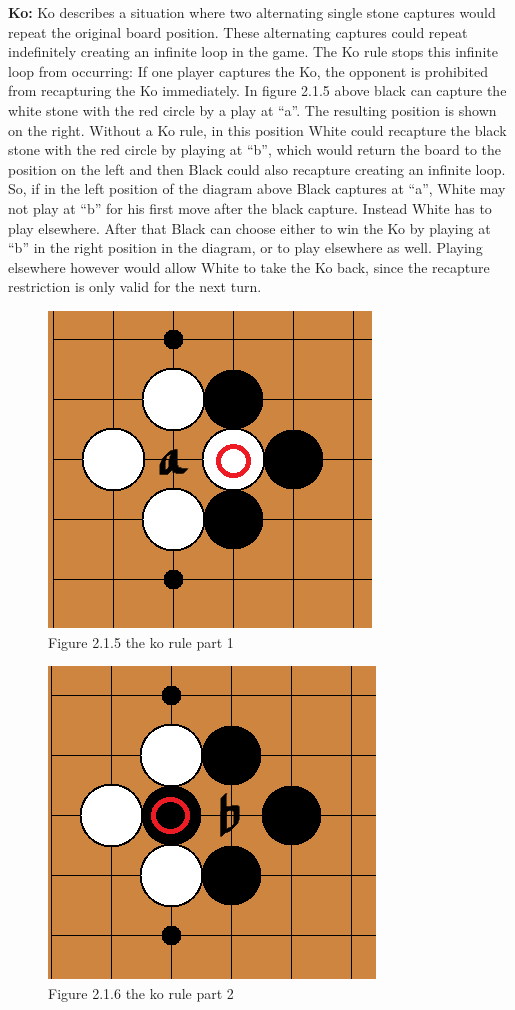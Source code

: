 \documentclass{l3proj}
\begin{document}
\textbf{Ko:} Ko describes a situation where two alternating single stone captures would repeat the original board position. These alternating captures could repeat indefinitely creating an infinite loop in the game. The Ko rule stops this infinite loop from occurring: If one player captures the Ko, the opponent is prohibited from recapturing the Ko immediately. In figure 2.1.5 above black can capture the white stone with the red circle by a play at “a”. The resulting position is shown on the right. Without a Ko rule, in this position White could recapture the black stone with the red circle by playing at “b”, which would return the board to the position on the left and then Black could also recapture creating an infinite loop. So, if in the left position of the diagram above Black captures at “a”, White may not play at “b” for his first move after the black capture. Instead White has to play elsewhere. After that Black can choose either to win the Ko by playing at “b” in the right position in the diagram, or to play elsewhere as well. Playing elsewhere however would allow White to take the Ko back, since the recapture restriction is only valid for the next turn.

\begin{figure}[H]
\centering
\includegraphics[scale=0.5]{Images/korule2.png}
\caption{Figure 2.1.5 the ko rule part 1}
\end{figure}

\begin{figure}[H]
\centering
\includegraphics[scale=0.5]{Images/korule1.png}
\caption{Figure 2.1.6 the ko rule part 2}
\end{figure}
\end{document}
